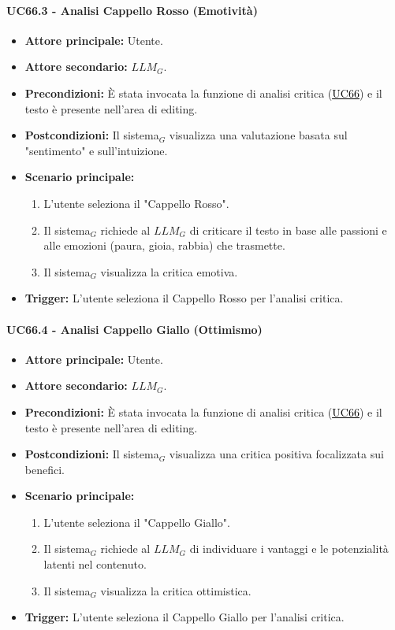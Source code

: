 \documentclass[a4paper, 10pt]{article}
\newcommand{\uclink}[2]{\hyperlink{#1}{\textcolor{black}{\underline{#2}}}}
\begin{document}
\hypertarget{uc:66.3}{}
\paragraph{UC66.3 - Analisi Cappello Rosso (Emotività)}
\begin{itemize}
    \item \textbf{Attore principale:} Utente.
    \item \textbf{Attore secondario:} $LLM_G$.
    \item \textbf{Precondizioni:} È stata invocata la funzione di analisi critica (\uclink{uc:66}{UC66}) e il testo è presente nell'area di editing.
    \item \textbf{Postcondizioni:} Il sistema$_G$ visualizza una valutazione basata sul "sentimento" e sull'intuizione.
    \item \textbf{Scenario principale:}
    \begin{enumerate}
        \item L'utente seleziona il "Cappello Rosso".
        \item Il sistema$_G$ richiede al $LLM_G$ di criticare il testo in base alle passioni e alle emozioni (paura, gioia, rabbia) che trasmette.
        \item Il sistema$_G$ visualizza la critica emotiva.
    \end{enumerate}
    \item \textbf{Trigger:} L'utente seleziona il Cappello Rosso per l'analisi critica.
\end{itemize}

\hypertarget{uc:66.4}{}
\paragraph{UC66.4 - Analisi Cappello Giallo (Ottimismo)}
\begin{itemize}
    \item \textbf{Attore principale:} Utente.
    \item \textbf{Attore secondario:} $LLM_G$.
    \item \textbf{Precondizioni:} È stata invocata la funzione di analisi critica (\uclink{uc:66}{UC66}) e il testo è presente nell'area di editing.
    \item \textbf{Postcondizioni:} Il sistema$_G$ visualizza una critica positiva focalizzata sui benefici.
    \item \textbf{Scenario principale:}
    \begin{enumerate}
        \item L'utente seleziona il "Cappello Giallo".
        \item Il sistema$_G$ richiede al $LLM_G$ di individuare i vantaggi e le potenzialità latenti nel contenuto.
        \item Il sistema$_G$ visualizza la critica ottimistica.
    \end{enumerate}
    \item \textbf{Trigger:} L'utente seleziona il Cappello Giallo per l'analisi critica.
\end{itemize}
\end{document}
